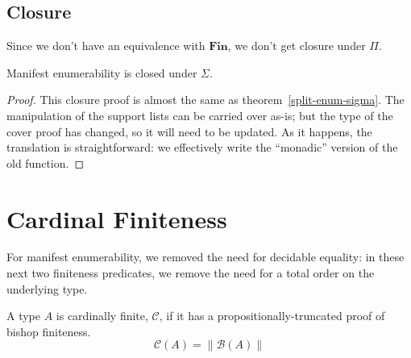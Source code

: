 \subsection{Closure}
Since we don't have an equivalence with \(\mathbf{Fin}\), we don't get closure
under \(\Pi\).
\begin{rm-lemma}
  Manifest enumerability is closed under \(\Sigma\).
\end{rm-lemma}
\begin{proof}
  This closure proof is almost the same as theorem~\ref{split-enum-sigma}.
  The manipulation of the support lists can be carried over as-is; but the type
  of the cover proof has changed, so it will need to be updated.
  As it happens, the translation is straightforward: we effectively write the
  ``monadic'' version of the old function.
\end{proof}
\section{Cardinal Finiteness} \label{cardinal}
For manifest enumerability, we removed the need for decidable equality: in these
next two finiteness predicates, we remove the need for a total order on the
underlying type.
\begin{rm-definition}
  A type \(A\) is cardinally finite, \(\mathcal{C}\), if it has a
  propositionally-truncated proof of bishop finiteness.
  \begin{equation}
    \mathcal{C}(A) = \lVert \mathcal{B}(A) \rVert
  \end{equation}%
\end{rm-definition}%
